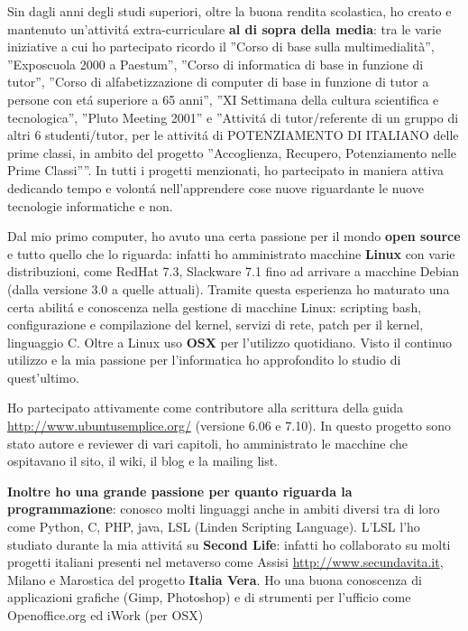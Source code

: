 \documentclass[totpages,helvetica,openbib,italian]{europecv}
\begin{document}
\begin{europecv}
{Sin dagli anni degli studi superiori, oltre la buona rendita scolastica, ho creato e mantenuto un'attivit\'a extra-curriculare \textbf{al di sopra della media}: tra le varie iniziative a cui ho partecipato ricordo il ''Corso di base sulla multimedialità'', ''Exposcuola 2000 a Paestum'', ''Corso di informatica di base in funzione di tutor'', ''Corso di alfabetizzazione di computer di base in funzione di tutor a persone con et\'a superiore a 65 anni'', ''XI Settimana della cultura scientifica e tecnologica'', ''Pluto Meeting 2001'' e ''Attivit\'a di tutor/referente di un gruppo di altri 6 studenti/tutor, per le attivit\'a di POTENZIAMENTO DI ITALIANO delle prime classi, in ambito del progetto ''Accoglienza, Recupero, Potenziamento nelle Prime Classi''''. In tutti i progetti menzionati, ho partecipato in maniera attiva dedicando tempo e volont\'a nell'apprendere cose nuove riguardante le nuove tecnologie informatiche e non.

Dal mio primo computer, ho avuto una certa passione per il mondo \textbf{open source} e tutto quello che lo riguarda: infatti ho amministrato macchine \textbf{Linux} con varie distribuzioni, come RedHat 7.3, Slackware 7.1 fino ad arrivare a macchine Debian (dalla versione 3.0 a quelle attuali). Tramite questa esperienza ho maturato una certa abilit\'a e conoscenza nella gestione di macchine Linux: scripting bash, configurazione e compilazione del kernel, servizi di rete, patch per il kernel, linguaggio C. Oltre a Linux uso \textbf{OSX} per l'utilizzo quotidiano. Visto il continuo utilizzo e la mia passione per l'informatica ho approfondito lo studio di quest'ultimo.

Ho partecipato attivamente come contributore alla scrittura della guida \url{http://www.ubuntusemplice.org/} (versione 6.06 e 7.10). In questo progetto sono stato autore e reviewer di vari capitoli, ho amministrato le macchine che ospitavano il sito, il wiki, il blog e la mailing list.

\textbf{Inoltre ho una grande passione per quanto riguarda la programmazione}: conosco molti linguaggi anche in ambiti diversi tra di loro come Python, C, PHP, java, LSL (Linden Scripting Language). L'LSL l'ho studiato durante la mia attivit\'a su \textbf{Second Life}: infatti ho collaborato su molti progetti italiani presenti nel metaverso come Assisi \url{http://www.secundavita.it}, Milano e Marostica del progetto \textbf{Italia Vera}.
Ho una buona conoscenza di applicazioni grafiche (Gimp, Photoshop) e di strumenti per l'ufficio come Openoffice.org ed iWork (per OSX)}


\end{europecv}
\end{document}
